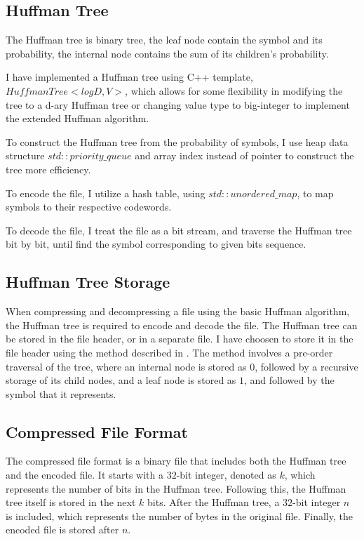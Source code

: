 \documentclass[a4paper,conference]{IEEEtran}
\begin{document}
\subsection{Huffman Tree}

The Huffman tree is binary tree, the leaf node contain the symbol and its probability, the internal node contains the sum of its children's probability.

I have implemented a Huffman tree using C++ template, $HuffmanTree<logD, V>$, which allows for some flexibility in modifying the tree to a d-ary Huffman tree or changing value type to big-integer to implement the extended Huffman algorithm.

To construct the Huffman tree from the probability of symbols, I use heap data structure $std::priority\_queue$ and array index instead of pointer to construct the tree more efficiency.

To encode the file, I utilize a hash table, using $std::unordered\_map$, to map symbols to their respective codewords.

To decode the file, I treat the file as a bit stream, and traverse the Huffman tree bit by bit, until find the symbol corresponding to given bits sequence.

\subsection{Huffman Tree Storage}

When compressing and decompressing a file using the basic Huffman algorithm, the Huffman tree is required to encode and decode the file. The Huffman tree can be stored in the file header, or in a separate file. I have choosen to store it in the file header using the method described in \cite{efficient-way-of-storing-Huffman-tree}. The method involves a pre-order traversal of the tree, where an internal node is stored as $0$, followed by a recursive storage of its child nodes, and a leaf node is stored as $1$, and followed by the symbol that it represents.

\subsection{Compressed File Format}

The compressed file format is a binary file that includes both the Huffman tree and the encoded file. It starts with a $32$-bit integer, denoted as $k$, which represents the number of bits in the Huffman tree. Following this, the Huffman tree itself is stored in the next $k$ bits. After the Huffman tree, a $32$-bit integer $n$ is included, which represents the number of bytes in the original file. Finally, the encoded file is stored after $n$.
\end{document}
